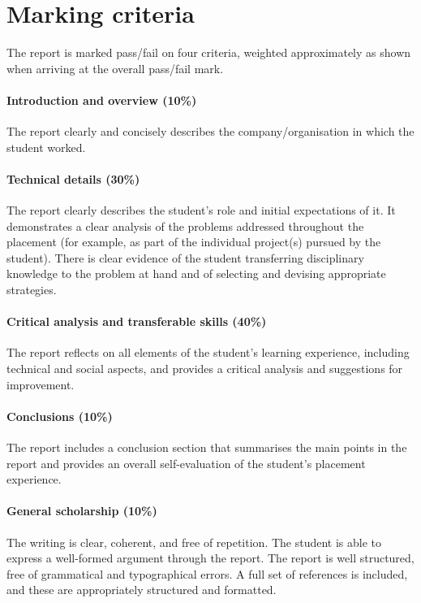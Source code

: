 \documentclass[british,12pt,a4paper]{report}
\begin{document}
\section{Marking criteria}

The report is marked pass/fail on four criteria,
weighted approximately as shown when arriving at the overall pass/fail mark.

\paragraph{Introduction and overview (10\%)}
The report clearly and concisely describes the company/organisation in which the student worked.

\paragraph{Technical details (30\%)}
The report clearly describes the student's role and initial expectations of it.
It demonstrates a clear analysis of the problems addressed throughout the placement
(for example, as part of the individual project(s) pursued by the student).
There is clear evidence of the student transferring disciplinary knowledge
to the problem at hand and of selecting and devising appropriate strategies.

\paragraph{Critical analysis and transferable skills (40\%)}
The report reflects on all elements of the student's learning experience,
including technical and social aspects, and provides a critical analysis and suggestions
for improvement.

\paragraph{Conclusions (10\%)}
The report includes a conclusion section that
summarises the main points in the report
and provides an overall self-evaluation of the student's placement experience.

\paragraph{General scholarship (10\%)}
The writing is clear, coherent, and free of repetition.
The student is able to express a well-formed argument through the report.
The report is well structured, free of grammatical and typographical errors.
A full set of references is included, and these are appropriately structured and formatted.

\printglossaries{}


\end{document}
